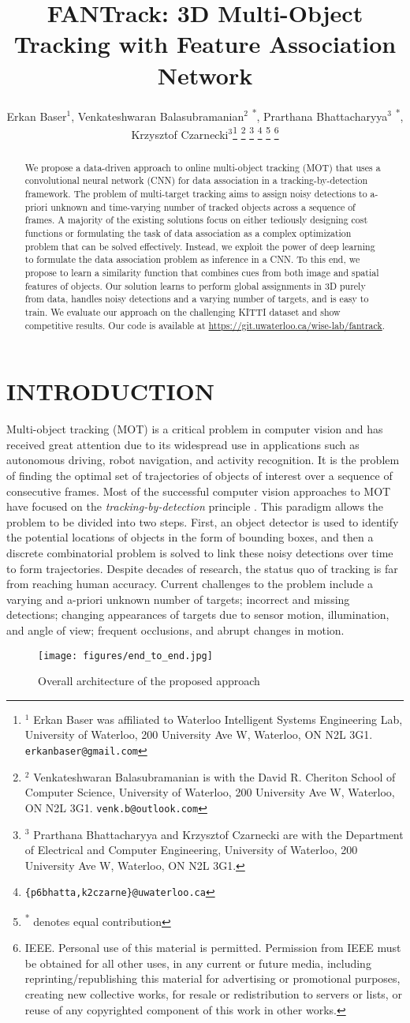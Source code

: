 \documentclass[letterpaper, 10 pt, conference]{ieeeconf}
\title{\LARGE \bf
FANTrack: 3D Multi-Object Tracking with Feature Association Network
}
\author{Erkan Baser$^{1}$, Venkateshwaran Balasubramanian$^{2}$ \textsuperscript{*}, Prarthana Bhattacharyya$^{3}$ \textsuperscript{*}, Krzysztof Czarnecki$^{3}$\thanks{$^{1}$ Erkan Baser was affiliated to Waterloo Intelligent Systems Engineering Lab, University of Waterloo, 200 University Ave W, Waterloo, ON N2L 3G1. {\tt\small erkanbaser@gmail.com}}
\thanks{$^{2}$ Venkateshwaran Balasubramanian is with the David R. Cheriton School of Computer Science, University of Waterloo, 200 University Ave W, Waterloo, ON N2L 3G1. {\tt\small venk.b@outlook.com}}
\thanks{$^{3}$ Prarthana Bhattacharyya and Krzysztof Czarnecki are with the Department of Electrical and Computer Engineering, University of Waterloo, 200 University Ave W, Waterloo, ON N2L 3G1.}
\thanks{{\tt\small \{p6bhatta,k2czarne\}@uwaterloo.ca}}
\thanks{\textsuperscript{*} denotes equal contribution}
\thanks{\newline \textcopyright \enspace 2019 IEEE. Personal use of this material is permitted. Permission from IEEE must be obtained for all other uses, in any current or future media, including reprinting/republishing this material for advertising or promotional purposes, creating new collective works, for resale or redistribution to servers or lists, or reuse of any copyrighted component of this work in other works.}
}
\begin{document}
\maketitle
\pagestyle{empty}


\begin{abstract}
We propose a data-driven approach to online multi-object tracking (MOT) that uses a convolutional neural network (CNN) for data association in a tracking-by-detection framework. The problem of multi-target tracking aims to assign noisy detections to a-priori unknown and time-varying number of tracked objects across a sequence of frames. A majority of the existing solutions focus on either tediously designing cost functions or formulating the task of data association as a complex optimization problem that can be solved effectively. Instead, we exploit the power of deep learning to formulate the data association problem as inference in a CNN. To this end, we propose to learn a similarity function that combines cues from both image and spatial features of objects. Our solution learns to perform global assignments in 3D purely from data, handles noisy detections and a varying number of targets, and is easy to train. We evaluate our approach on the challenging KITTI dataset and show competitive results. Our code is available at \url{https://git.uwaterloo.ca/wise-lab/fantrack}.
\end{abstract}


\section{INTRODUCTION}
Multi-object tracking (MOT) is a critical problem in computer vision and has received great attention due to its widespread use in applications such as autonomous driving, robot navigation, and activity recognition. It is the problem of finding the optimal set of trajectories of objects of interest over a sequence of consecutive frames. Most of the successful computer vision approaches to MOT have focused on the \textit{tracking-by-detection} principle \cite{Okuma2004ABP, trackdet}. This paradigm allows the problem to be divided into two steps. First, an object detector is used to identify the potential locations of objects in the form of bounding boxes, and then a discrete combinatorial problem is solved to link these noisy detections over time to form trajectories. Despite decades of research, the status quo of tracking is far from reaching human accuracy. Current challenges to the problem include a varying and a-priori unknown number of targets; incorrect and missing detections; changing appearances of targets due to sensor motion, illumination, and angle of view; frequent occlusions, and abrupt changes in motion.
\begin{figure}[t]
\begin{center}
\texttt{[image: figures/end\_to\_end.jpg]}
\end{center}
\caption{Overall architecture of the proposed approach}
\label{end_to_end}
\end{figure}
\end{document}
